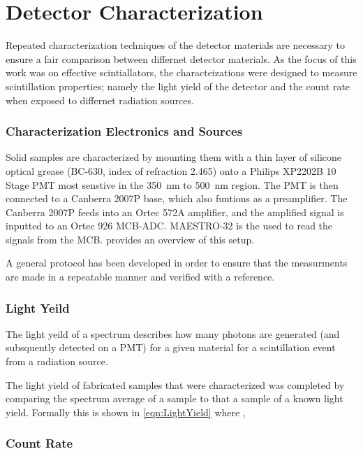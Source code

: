\chapter{Detector Characterization}
\label{chap:DetChar}
Repeated characterization techniques of the detector materials are necessary to ensure a fair comparison between differnet detector materials.
As the focus of this work was on effective scintiallators, the characteizations were designed to measure scintillation properties; namely the light yield of the detector and the count rate when exposed to differnet radiation sources.

\subsection{Characterization Electronics and Sources}
Solid samples are characterized by mounting them with a thin layer of silicone optical grease (BC-630, index of refraction 2.465) onto a Philips XP2202B 10 Stage PMT most senstive in the \SI{350}{\nm} to \SI{500}{\nm} region.
The PMT is then connected to a Canberra 2007P base, which also funtions as a preamplifier.
The Canberra 2007P feeds into an Ortec 572A amplifier, and the amplified signal is inputted to an Ortec 926 MCB-ADC.
MAESTRO-32 is the used to read the signals from the MCB.
 provides an overview of this setup.
\begin{figure}
  \label{fig:ElectronicSetup}
\end{figure}
A general protocol has been developed in order to ensure that the measurments are made in a repeatable manner and verified with a reference.
\begin{enumerate}
\end{enumerate}
\subsection{Light Yeild}
The light yeild of a spectrum describes how many photons are generated (and subsquently detected on a PMT) for a given material for a scintillation event from a radiation source.

The light yield of fabricated samples that were characterized was completed by comparing the spectrum average of a sample to that a sample of a known light yield.
Formally this is shown in \eqref{eqn:LightYield} where , 

\subsection{Count Rate}
